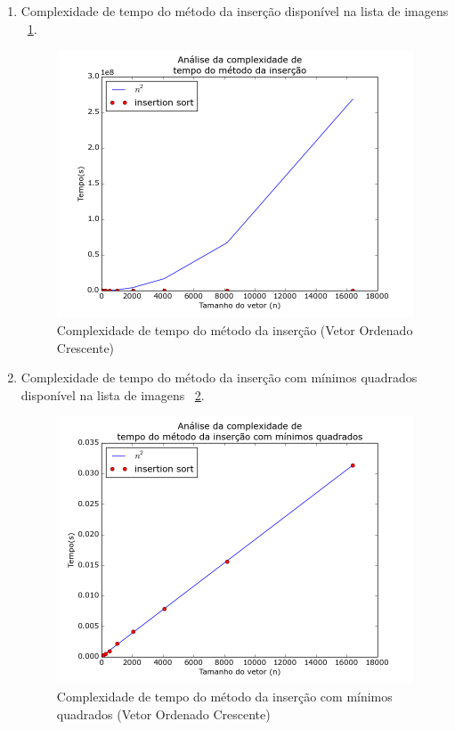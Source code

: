 \documentclass[12pt,a4paper,twoside]{report}
\begin{document}
\begin{enumerate}
\begin{enumerate}
			\item Complexidade de tempo do método da inserção disponível na lista de imagens ~\ref{fig:InsertionPlot2OC}.
			\begin{figure}[!h]
				\centering
				\includegraphics[scale=0.6]{../imagens/Insertion/insertion_plot_2_ordenado_crescente.png}
				\caption{Complexidade de tempo do método da inserção (Vetor Ordenado Crescente) \label{fig:InsertionPlot2OC}}
			\end{figure}


			\item Complexidade de tempo do método da inserção com mínimos quadrados disponível na lista de imagens ~\ref{fig:InsertionPlot3OC}.
			\begin{figure}[!h]
				\centering
				\includegraphics[scale=0.6]{../imagens/Insertion/insertion_plot_3_ordenado_crescente.png}
				\caption{Complexidade de tempo do método da inserção com mínimos quadrados (Vetor Ordenado Crescente) \label{fig:InsertionPlot3OC}}
			\end{figure}


\end{enumerate}
\end{enumerate}
\end{document}

